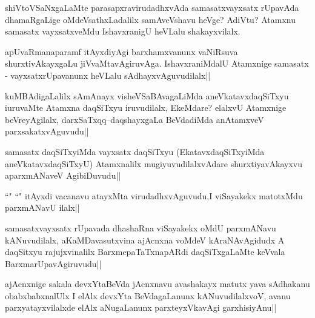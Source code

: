 
\begin{artha}
shiVtoVSaNxgaLaMte parasapxravirudadhxvAda samasatxvayxsatx rUpavAda dhamaRgaLige oMdeVsathxLadalilx samAveVshavu heVge? AdiVtu? Atamxnu samasatx vayxsatxveMdu IshavxranigU heVLalu shakayxvilalx.
\end{artha}

\begin{artha}
apUvaRmanaparamf itAyxdiyAgi barxhamxvanunx vaNiRsuva shurxtivAkayxgaLu jiVvaMtavAgiruvAga. IshavxraniMdalU Atamxnige samasatx - vayxsatxrUpavanunx heVLalu sAdhayxvAguvudilalx||
\end{artha}


\begin{artha}
kuMBAdigaLalilx sAmAnayx visheVSaBAvagaLiMda aneVkatavxdaqSiTxyu iuruvaMte Atamxna daqSiTxyu iruvudilalx, EkeMdare? elalxvU Atamxnige beVreyAgilalx, darxSaTxqq--daqshayxgaLa BeVdadiMda anAtamxveV parxsakatxvAguvudu||
\end{artha}


\begin{artha}
samasatx daqSiTxyiMda vayxsatx daqSiTxyu (EkatavxdaqSiTxyiMda aneVkatavxdaqSiTxyU) Atamxnalilx mugiyuvudilalxvAdare shurxtiyavAkayxvu aparxmANaveV AgibiDuvudu||
\end{artha}

\begin{artha}
``\stext" ``\stext" itAyxdi vacanavu atayxMta virudadhxvAguvudu,I viSayakekx matotxMdu 
parxmANavU ilalx||
\end{artha}


\begin{artha}
samasatxvayxsatx rUpavada dhashaRna viSayakekx oMdU parxmANavu kANuvudilalx, aKaMDavasutxvina ajAcnxna voMdeV kAraNAvAgidudx A daqSitxyu rajujxvinalilx BarxmepaTaTxnapARdi daqSiTxgaLaMte keVvala BarxmarUpavAgiruvudu||
\end{artha}


\begin{artha}
ajAcnxnige sakala devxYtaBeVda jAcnxnavu avashakayx matutx yava sAdhakanu obabxbabxnalUlx I elAlx devxYta BeVdagaLanunx kANuvudilalxvoV, avanu parxyatayxvilalxde elAlx aNugaLanunx parxteyxVkavAgi garxhisiyAnu||
\end{artha}

